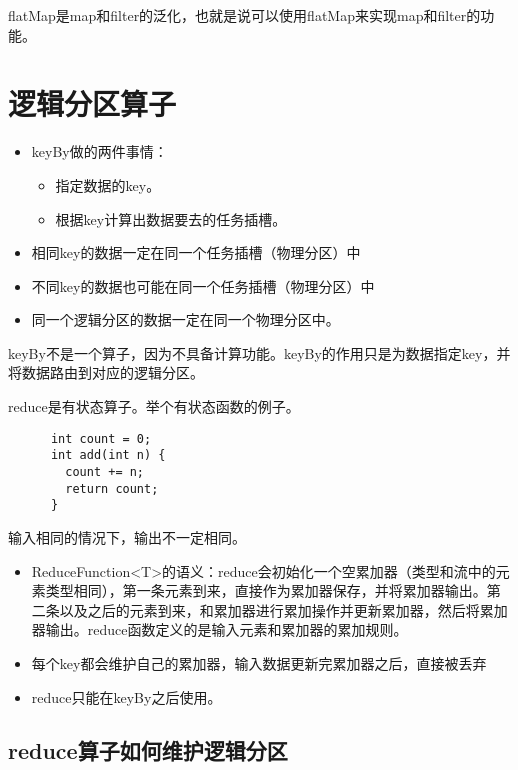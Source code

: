 \documentclass[cn,11pt,chinese]{elegantbook}
\begin{document}
flatMap是map和filter的泛化，也就是说可以使用flatMap来实现map和filter的功能。

\section{逻辑分区算子}

\begin{itemize}
  \item keyBy做的两件事情：
  \begin{itemize}
    \item 指定数据的key。
    \item 根据key计算出数据要去的任务插槽。
  \end{itemize}
  \item 相同key的数据一定在同一个任务插槽（物理分区）中
  \item 不同key的数据也可能在同一个任务插槽（物理分区）中
  \item 同一个逻辑分区的数据一定在同一个物理分区中。
\end{itemize}

\begin{note}
  keyBy不是一个算子，因为不具备计算功能。keyBy的作用只是为数据指定key，并将数据路由到对应的逻辑分区。
\end{note}

reduce是有状态算子。举个有状态函数的例子。

\begin{lstlisting}
      int count = 0;
      int add(int n) {
        count += n;
        return count;
      }
\end{lstlisting}

输入相同的情况下，输出不一定相同。

\begin{itemize}
  \item ReduceFunction<T>的语义：reduce会初始化一个空累加器（类型和流中的元素类型相同），第一条元素到来，直接作为累加器保存，并将累加器输出。第二条以及之后的元素到来，和累加器进行累加操作并更新累加器，然后将累加器输出。reduce函数定义的是输入元素和累加器的累加规则。
  \item 每个key都会维护自己的累加器，输入数据更新完累加器之后，直接被丢弃
  \item reduce只能在keyBy之后使用。
\end{itemize}

\subsection{reduce算子如何维护逻辑分区}
\end{document}
